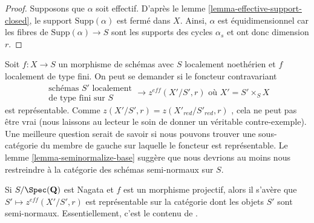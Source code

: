 \begin{proof} 
Supposons que  $\alpha$  soit effectif. D'après le lemme \ref{lemma-effective-support-closed},
 le support $\text{Supp}(\alpha)$  est fermé dans  $X$. Ainsi,  
$\alpha$  est équidimensionnel car les fibres de  $\text{Supp}(\alpha) \to S$
  sont les supports des cycles  $\alpha_s$  et ont donc dimension  $r$. 
\end{proof} 

\begin{remark} 
\label{remark-representable} 
Soit  $f : X \to S$  un morphisme de schémas avec  $S$  localement noethérien
 et  $f$  localement de type fini. On peut se demander si le foncteur contravariant 
$$
\begin{matrix}
\text{schémas }S'\text{ localement} \\
\text{de type fini sur }S
\end{matrix}
\longrightarrow
z^{eff}(X'/S', r)\text{ où }X' = S' \times_S X
$$
 est représentable. Comme  $z(X'/S', r) = z(X'_{red}/S'_{red}, r)$
 , cela ne peut pas être vrai (nous laissons au lecteur le soin de donner un véritable
 contre-exemple). Une meilleure question serait de savoir si nous pouvons 
trouver une sous-catégorie du membre de gauche sur laquelle le foncteur est
 représentable. Le lemme  \ref{lemma-seminormalize-base}  suggère que 
nous devrions au moins nous restreindre à la catégorie des schémas semi-normaux sur $S$. 

\medskip\noindent
 Si  $S/\Spec(\mathbf{Q})$  est Nagata et  $f$  est un morphisme projectif, alors
 il s'avère que  $S' \mapsto z^{eff}(X'/S', r)$  est représentable sur la 
catégorie dont les objets $S'$  sont semi-normaux. Essentiellement, c'est le contenu de 
\cite[théorème 3.21]{KRC}. 


\end{remark}
